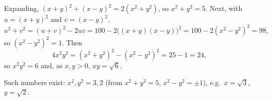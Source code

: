 Expanding, $(x+y)^2+(x-y)^2=2(x^2+y^2)$, so $x^2+y^2=5$. Next, with $u=(x+y)^2$ and $v=(x-y)^2$,
\[
u^2+v^2=(u+v)^2-2uv=100-2\bigl((x+y)(x-y)\bigr)^2=100-2(x^2-y^2)^2=98,
\]
so $(x^2-y^2)^2=1$. Then
\[
4x^2y^2=(x^2+y^2)^2-(x^2-y^2)^2=25-1=24,
\]
so $x^2y^2=6$ and, as $x,y>0$, $xy=\boxed{\sqrt6}$.

Such numbers exist: $x^2,y^2=3,2$ (from $x^2+y^2=5$, $x^2-y^2=\pm1$), e.g.\ $x=\sqrt3$, $y=\sqrt2$.
